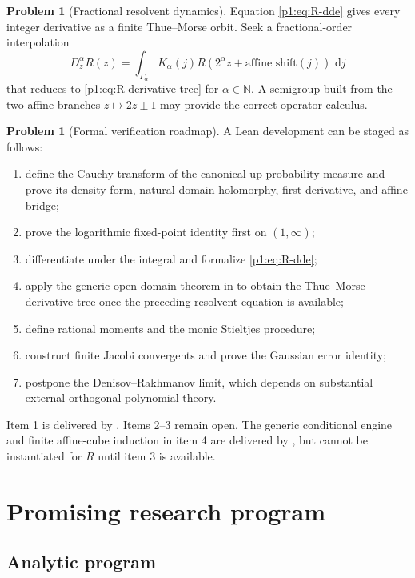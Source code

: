 \documentclass[11pt]{article}
\theoremstyle{definition}
\newtheorem{problem}[theorem]{Problem}
\theoremstyle{remark}
\newcommand{\N}{\mathbb N}
\newcommand{\dd}{\,\mathrm d}
\begin{document}
\begin{problem}[Fractional resolvent dynamics]
Equation \eqref{p1:eq:R-dde} gives every integer derivative as a finite Thue--Morse orbit.
Seek a fractional-order interpolation
\[
 D_z^{\alpha}R(z)=\int_{\Gamma_\alpha}K_\alpha(j)
 R(2^\alpha z+\text{affine shift}(j))\,\dd j
\]
that reduces to \eqref{p1:eq:R-derivative-tree} for \(\alpha\in\N\).  A semigroup built from
the two affine branches \(z\mapsto2z\pm1\) may provide the correct operator calculus.
\end{problem}

\begin{problem}[Formal verification roadmap]
A Lean development can be staged as follows:
\begin{enumerate}
\item define the Cauchy transform of the canonical up probability measure and prove its
      density form, natural-domain holomorphy, first derivative, and affine bridge;
\item prove the logarithmic fixed-point identity first on \((1,\infty)\);
\item differentiate under the integral and formalize \eqref{p1:eq:R-dde};
\item apply the generic open-domain theorem in  to
      obtain the Thue--Morse derivative tree once the preceding resolvent equation is
      available;
\item define rational moments and the monic Stieltjes procedure;
\item construct finite Jacobi convergents and prove the Gaussian error identity;
\item postpone the Denisov--Rakhmanov limit, which depends on substantial external
      orthogonal-polynomial theory.
\end{enumerate}
Item 1 is delivered by .  Items 2--3 remain open.  The generic
conditional engine and finite affine-cube induction in item 4 are delivered by
, but cannot be instantiated for \(R\) until item 3 is
available.
\end{problem}

\section{Promising research program}

\subsection{Analytic program}
\end{document}

